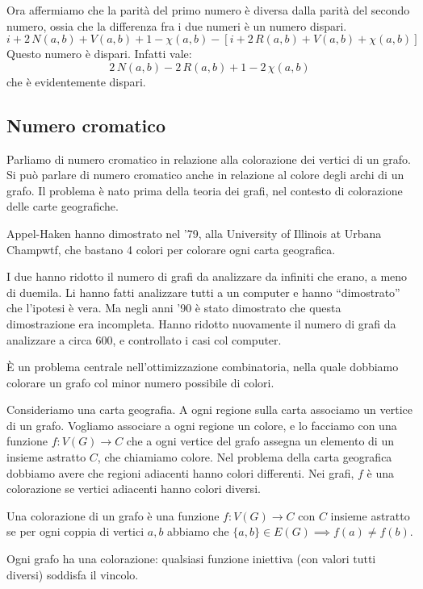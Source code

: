 	Ora affermiamo che la parit\`a del primo numero \`e diversa dalla parit\`a del secondo numero, ossia che la differenza fra i due numeri \`e un numero dispari.
	\[
		i + 2 \, N(a,b) + V(a,b) + 1 - \chi(a,b) - \left[ i + 2 \, R(a,b) + V(a,b) + \chi (a,b) \right]
	\]
	Questo numero \`e dispari.
	Infatti vale:
	\[
		2 \, N(a,b) - 2 \, R(a,b) + 1 - 2 \, \chi(a,b)
	\]
	che \`e evidentemente dispari.

	\subsection{Numero cromatico}

	Parliamo di numero cromatico in relazione alla colorazione dei vertici di un grafo.
	Si pu\`o parlare di numero cromatico anche in relazione al colore degli archi di un grafo.
	Il problema \`e nato prima della teoria dei grafi, nel contesto di colorazione delle carte geografiche.

	Appel-Haken hanno dimostrato nel '79, alla University of Illinois at Urbana Champwtf, che bastano 4 colori per colorare ogni carta geografica.

	I due hanno ridotto il numero di grafi da analizzare da infiniti che erano, a meno di duemila.
	Li hanno fatti analizzare tutti a un computer e hanno ``dimostrato'' che l'ipotesi \`e vera.
	Ma negli anni '90 \`e stato dimostrato che questa dimostrazione era incompleta.
	Hanno ridotto nuovamente il numero di grafi da analizzare a circa 600, e controllato i casi col computer.

	\`E un problema centrale nell'ottimizzazione combinatoria, nella quale dobbiamo colorare un grafo col minor numero possibile di colori.

	Consideriamo una carta geografia.
	A ogni regione sulla carta associamo un vertice di un grafo.
	Vogliamo associare a ogni regione un colore, e lo facciamo con una funzione $f: V(G) \to C$ che a ogni vertice del grafo assegna un elemento di un insieme astratto $C$, che chiamiamo colore.
	Nel problema della carta geografica dobbiamo avere che regioni adiacenti hanno colori differenti.
	Nei grafi, $f$ \`e una colorazione se vertici adiacenti hanno colori diversi.

	\begin{defn}
		Una colorazione di un grafo \`e una funzione $f : V(G) \to C$ con $C$ insieme astratto se per ogni coppia di vertici $a,b$ abbiamo che $\{a,b\} \in E(G) \implies f(a) \neq f(b)$.
	\end{defn}
	Ogni grafo ha una colorazione: qualsiasi funzione iniettiva (con valori tutti diversi) soddisfa il vincolo.

